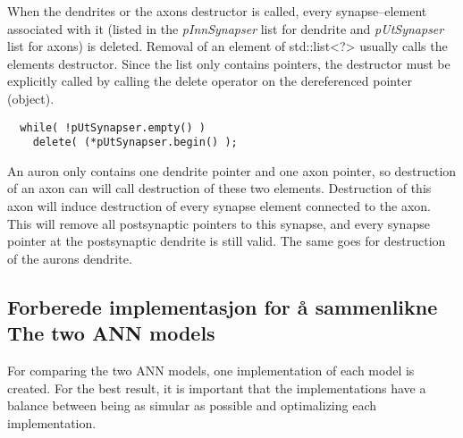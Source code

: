 	When the dendrites or the axons destructor is called, every synapse--element associated with it (listed in the \emph{pInnSynapser} list for dendrite and \emph{pUtSynapser} list for axons) is deleted. 
	Removal of an element of std::list<?> usually calls the elements destructor. Since the list only contains pointers, the destructor must be explicitly called by calling the delete operator on the dereferenced pointer (object).

\begin{lstlisting}
  while( !pUtSynapser.empty() )
  	delete( (*pUtSynapser.begin() );
\end{lstlisting}

	An auron only contains one dendrite pointer and one axon pointer, so destruction of an axon can will call destruction of these two elements.
	Destruction of this axon will induce destruction of every synapse element connected to the axon. This will remove all postsynaptic pointers to this synapse, and every synapse pointer at the postsynaptic dendrite is still valid.
	The same goes for destruction of the aurons dendrite.
	


	


	\subsection{Forberede implementasjon for å sammenlikne The two ANN models}

	For comparing the two ANN models, one implementation of each model is created. 
	For the best result, it is important that the implementations have a balance between being as simular as possible and optimalizing each implementation.

